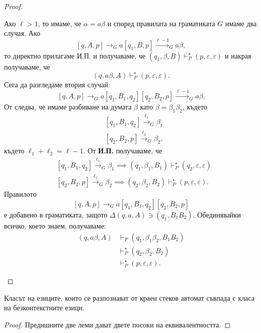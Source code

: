 \begin{proof}
\begin{description}
    Ако $\ell > 1$, то имаме, че $\alpha = a\beta$ и според правилата на граматиката $G$ имаме два случая.
    Ако
    \[[q,A,p] \rightarrow_G a[q_1,B,p] \stackrel{\ell-1}{\to}_G a\beta,\]
    то директно прилагаме И.П. и получаваме, че
    $(q_1,\beta,B) \vdash^\star_P (p,\varepsilon,\varepsilon)$ и накрая получаваме, че
    \[(q,a\beta,A) \vdash^\star_P (p,\varepsilon,\varepsilon).\]
    Сега да разгледаме втория случай:
    \[[q,A,p] \rightarrow_G a[q_1,B_1,q_2][q_2,B_2,p] \stackrel{\ell-1}{\to}_G a\beta.\]
    От  следва, че имаме разбиване на думата $\beta$ като $\beta = \beta_1\beta_2$, където 
    \begin{align*}
      & [q_1,B_1,q_2] \stackrel{\ell_1}{\to}_G \beta_1\\
      & [q_2,B_2,p] \stackrel{\ell_2}{\to}_G \beta_2.
    \end{align*}
    където $\ell_1 + \ell_2 = \ell - 1$.
    От {\bf И.П.} получаваме, че 
    \begin{align*}
      & [q_1,B_1,q_{2}] \stackrel{\ell_1}{\to}_G \beta_1 \implies (q_1,\beta_1,B_1) \vdash^\star_P (q_{2},\varepsilon,\varepsilon) \\
      & [q_2,B_2,p] \stackrel{\ell_2}{\to}_G \beta_2 \implies (q_2,\beta_2,B_2) \vdash^\star_P (p,\varepsilon,\varepsilon).
    \end{align*}
    Правилото
    \[[q,A,p] \rightarrow_G a[q_1,B_1,q_2][q_2,B_2,p]\]
    е добавено в граматиката, защото $\Delta(q,a,A) \ni (q_1, B_1B_2)$. 
    Обединявайки всичко, което знаем, получаваме:
    \begin{align*}
      (q, a\beta, A) & \vdash_P (q_1, \beta_1\beta_2, B_1B_2)\\
                     & \vdash^\star_P (q_2, \beta_2, B_2)\\
                     & \vdash^\star_P (p, \varepsilon, \varepsilon).
    \end{align*}
  \end{description}
\end{proof}
  
  
\begin{framed}
\begin{thm}
  \label{th:push-down-context-free}
  Класът на езиците, които се разпознават от краен стеков автомат съвпада с
  класа на безконтекстните езици.
\end{thm}
\end{framed}
\begin{proof}
  Предишните две леми дават двете посоки на еквивалентността.
\end{proof}

